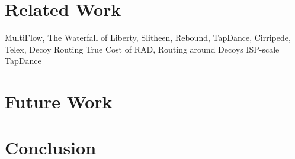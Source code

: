 \documentclass[letterpaper,twocolumn,10pt]{article}
\begin{document}




\section{Related Work}

MultiFlow, The Waterfall of Liberty, Slitheen, Rebound, TapDance, Cirripede, Telex, Decoy Routing
True Cost of RAD, Routing around Decoys
ISP-scale TapDance


\section{Future Work}

\section{Conclusion}

%



\small

\end{document}
